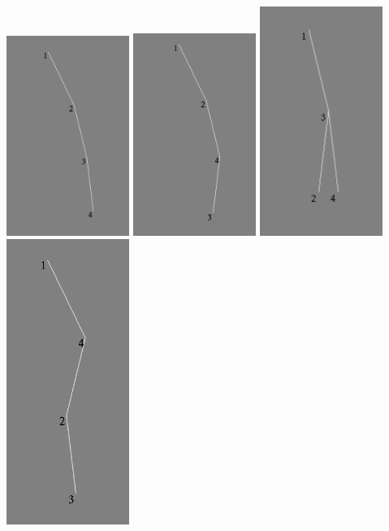 \documentclass{ltjsarticle}
\begin{document}
\includegraphics[width=4cm]{2.png}
\includegraphics[width=4cm]{3.png}
\includegraphics[width=4cm]{4.png}
\includegraphics[width=4cm]{5.png}
\end{document}
